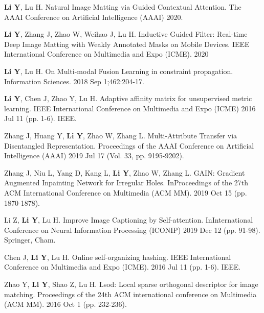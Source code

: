 

\begin{publications}
  \item {\bf{Li Y}}, Lu H. Natural Image Matting via Guided Contextual Attention. The AAAI Conference on Artificial Intelligence (AAAI) 2020.
  \item {\bf{Li Y}}, Zhang J, Zhao W, Weihao J, Lu H. Inductive Guided Filter: Real-time Deep Image Matting with Weakly Annotated Masks on Mobile Devices. IEEE International Conference on Multimedia and Expo (ICME). 2020
  \item {\bf{Li Y}}, Lu H. On Multi-modal Fusion Learning in constraint propagation. Information Sciences. 2018 Sep 1;462:204-17.
  \item {\bf{Li Y}}, Chen J, Zhao Y, Lu H. Adaptive affinity matrix for unsupervised metric learning. IEEE International Conference on Multimedia and Expo (ICME) 2016 Jul 11 (pp. 1-6). IEEE.
  \item Zhang J, Huang Y, {\bf{Li Y}}, Zhao W, Zhang L. Multi-Attribute Transfer via Disentangled Representation. Proceedings of the AAAI Conference on Artificial Intelligence (AAAI) 2019 Jul 17 (Vol. 33, pp. 9195-9202).
  \item Zhang J, Niu L, Yang D, Kang L, {\bf{Li Y}}, Zhao W, Zhang L. GAIN: Gradient Augmented Inpainting Network for Irregular Holes. InProceedings of the 27th ACM International Conference on Multimedia (ACM MM). 2019 Oct 15 (pp. 1870-1878).
  \item Li Z, {\bf{Li Y}}, Lu H. Improve Image Captioning by Self-attention. InInternational Conference on Neural Information Processing (ICONIP) 2019 Dec 12 (pp. 91-98). Springer, Cham.
  \item Chen J, {\bf{Li Y}}, Lu H. Online self-organizing hashing. IEEE International Conference on Multimedia and Expo (ICME). 2016 Jul 11 (pp. 1-6). IEEE.
  \item Zhao Y, {\bf{Li Y}}, Shao Z, Lu H. Lsod: Local sparse orthogonal descriptor for image matching. Proceedings of the 24th ACM international conference on Multimedia (ACM MM). 2016 Oct 1 (pp. 232-236).
\end{publications}

